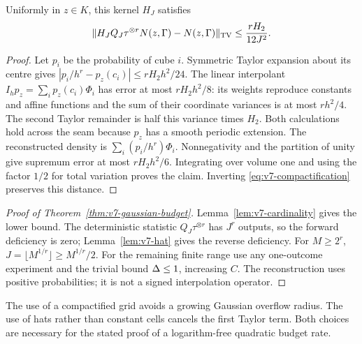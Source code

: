\begin{lemma}
\label{lem:v7-hat}
Uniformly in $z\in K$, this kernel $H_J$ satisfies
\begin{equation}
 \|H_J Q_J\tau^{\otimes r} N(z,\Gamma)-N(z,\Gamma)\|_{\rm TV}
                         \le\frac{r H_2}{12J^2}.       \label{eq:v7-hat}
\end{equation}
\end{lemma}
\begin{proof}
Let $p_i$ be the probability of cube $i$. Symmetric Taylor expansion
about its centre gives
$|p_i/h^r-p_z(c_i)|\le rH_2h^2/24$.
The linear interpolant $I_hp_z=\sum_i p_z(c_i)\Phi_i$ has error at most
$rH_2h^2/8$: its weights reproduce constants and affine functions and
the sum of their coordinate variances is at most $rh^2/4$. The second
Taylor remainder is half this variance times $H_2$. Both calculations
hold across the seam because $p_z$ has a smooth periodic extension.
The reconstructed density is
$\sum_i(p_i/h^r)\Phi_i$. Nonnegativity and the partition of unity give
supremum error at most $rH_2h^2/6$. Integrating over volume one and
using the factor $1/2$ for total variation proves the claim. Inverting
\eqref{eq:v7-compactification} preserves this distance.
\end{proof}

\begin{proof}[Proof of Theorem~\ref{thm:v7-gaussian-budget}]
Lemma~\ref{lem:v7-cardinality} gives the lower bound. The deterministic
statistic $Q_J\tau^{\otimes r}$ has $J^r$ outputs, so the forward
deficiency is zero; Lemma~\ref{lem:v7-hat} gives the reverse deficiency.
For $M\ge2^r$, $J=\lfloor M^{1/r}\rfloor\ge M^{1/r}/2$.
For the remaining finite range use any one-outcome experiment and the
trivial bound $\Delta\le1$, increasing $C$. The reconstruction uses
positive probabilities; it is not a signed interpolation operator.
\end{proof}

The use of a compactified grid avoids a growing Gaussian overflow
radius. The use of hats rather than constant cells cancels the first
Taylor term. Both choices are necessary for the stated proof of a
logarithm-free quadratic budget rate.
